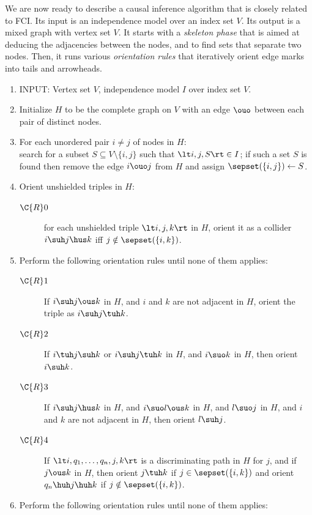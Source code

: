 We are now ready to describe a causal inference algorithm that is closely related to FCI.
Its input is an independence model over an index set $V$. Its output is a mixed graph with vertex set $V$.
It starts with a \emph{skeleton phase} that is aimed at deducing the adjacencies between the nodes, and to find sets that separate two nodes.
Then, it runs various \emph{orientation rules} that iteratively orient edge marks into tails and arrowheads.
\begin{enumerate}
  \item INPUT: Vertex set $V$, independence model $I$ over index set $V$.
  \item Initialize $H$ to be the complete graph on $V$ with an edge $\ouo$ between each pair of distinct nodes.
  \item For each unordered pair $i \ne j$ of nodes in $H$:\\
    search for a subset $S \subseteq V \setminus \{i,j\}$ such that $\lt i, j, S \rt \in I$;
    if such a set $S$ is found then remove the edge $i \ouo j$ from $H$ and assign $\sepset(\{i,j\}) \leftarrow S$.
  \item Orient unshielded triples in $H$:\label{alg:fci_R0}
    \begin{description}
    \item[$\C{R}0$] for each unshielded triple $\lt i,j,k \rt$ in $H$, orient it as a collider $i \suh j \hus k$ iff $j \notin \sepset(\{i,k\})$.
    \end{description}
  \item Perform the following orientation rules until none of them applies:
    \begin{description}
      \item[$\C{R}1$] If $i \suh j \ous k$ in $H$, and $i$ and $k$ are not adjacent in $H$, orient the triple as $i \suh j \tuh k$.
      \item[$\C{R}2$] If $i \tuh j \suh k$ or $i \suh j \tuh k$ in $H$, and $i \suo k$ in $H$, then orient $i \suh k$.
      \item[$\C{R}3$] If $i \suh j \hus k$ in $H$, and $i \suo l \ous k$ in $H$, and $l \suo j$ in $H$, and $i$ and $k$ are not adjacent in $H$, then orient $l \suh j$.
      \item[$\C{R}4$] If $\lt i, q_1, \dots, q_n, j, k \rt$ is a discriminating path in $H$ for $j$, and if $j \ous k$ in $H$, then orient $j \tuh k$ if $j \in \sepset(\{i,k\})$ and orient $q_n \huh j \huh k$ if $j \notin \sepset(\{i,k\})$.
    \end{description}
  \item Perform the following orientation rules until none of them applies:

\end{enumerate}
